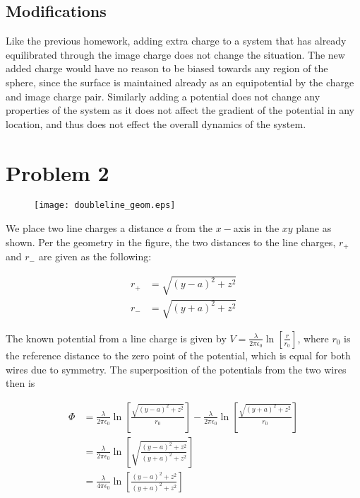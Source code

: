 \documentclass[paper=a4, fontsize=11pt]{scrartcl} %
\numberwithin{equation}{section} %
\numberwithin{figure}{section} %
\numberwithin{table}{section} %
\begin{document}
\subsection{Modifications}
Like the previous homework, adding extra charge to a system that has already equilibrated through the image charge does not change the situation. The new added charge would have no reason to be biased towards any region of the sphere, since the surface is maintained already as an equipotential by the charge and image charge pair. Similarly adding a potential does not change any properties of the system as it does not affect the gradient of the potential in any location, and thus does not effect the overall dynamics of the system.

\section{Problem 2}

\begin{figure}[H]
\begin{center}
\texttt{[image: doubleline\_geom.eps]}
\end{center}
\end{figure}


We place two line charges a distance $a$ from the $x-$axis in the $xy$ plane as shown. Per the geometry in the figure, the two distances to the line charges, $r_+$ and $r_-$ are given as the following:

\begin{align}
r_+ &= \sqrt{(y-a)^2 + z^2} \\
r_- &= \sqrt{(y+a)^2 + z^2}  
\end{align}

The known potential from a line charge is given by $V = \frac{\lambda}{2 \pi \epsilon_0}\ln\left[\frac{r}{r_0}\right]$, where $r_0$ is the reference distance to the zero point of the potential, which is equal for both wires due to symmetry. The superposition of the potentials from the two wires then is

\begin{align}
\Phi &= \frac{\lambda}{2 \pi \epsilon_0}\ln\left[\frac{\sqrt{(y-a)^2 + z^2}}{r_0}\right] - \frac{\lambda}{2\pi\epsilon_0}\ln\left[\frac{\sqrt{(y+a)^2 + z^2}}{r_0}\right] \\
&= \frac{\lambda}{2 \pi \epsilon_0}\ln\left[\sqrt{\frac{(y-a)^2 + z^2}{(y+a)^2 + z^2}}\right] \\
&= \frac{\lambda}{4 \pi \epsilon_0}\ln\left[\frac{(y-a)^2 + z^2}{(y+a)^2 + z^2}\right]
\end{align}
\end{document}
